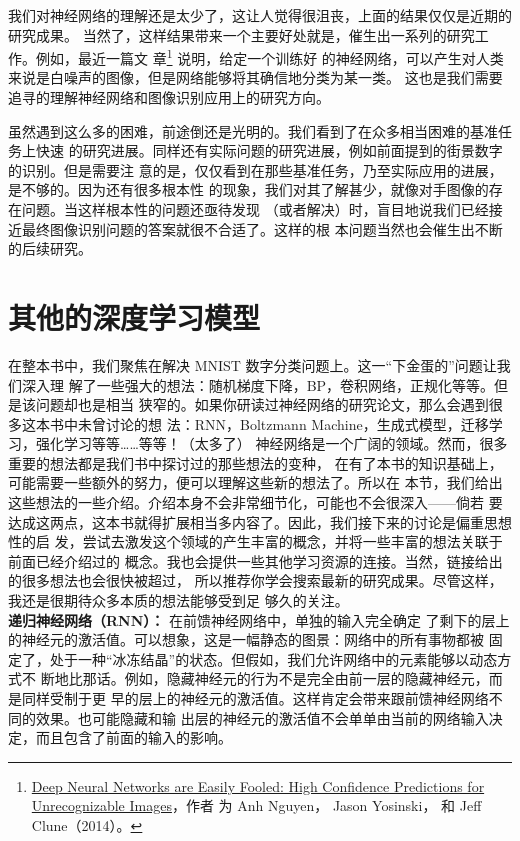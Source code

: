 我们对神经网络的理解还是太少了，这让人觉得很沮丧，上面的结果仅仅是近期的研究成果。
当然了，这样结果带来一个主要好处就是，催生出一系列的研究工作。例如，最近一篇文
章\footnote{\href{http://arxiv.org/abs/1412.1897}{Deep Neural Networks are
    Easily Fooled: High Confidence Predictions for Unrecognizable Images}，作者
  为 Anh Nguyen， Jason Yosinski， 和 Jeff Clune（2014）。} 说明，给定一个训练好
的神经网络，可以产生对人类来说是白噪声的图像，但是网络能够将其确信地分类为某一类。
这也是我们需要追寻的理解神经网络和图像识别应用上的研究方向。

虽然遇到这么多的困难，前途倒还是光明的。我们看到了在众多相当困难的基准任务上快速
的研究进展。同样还有实际问题的研究进展，例如前面提到的街景数字的识别。但是需要注
意的是，仅仅看到在那些基准任务，乃至实际应用的进展，是不够的。因为还有很多根本性
的现象，我们对其了解甚少，就像对手图像的存在问题。当这样根本性的问题还亟待发现
（或者解决）时，盲目地说我们已经接近最终图像识别问题的答案就很不合适了。这样的根
本问题当然也会催生出不断的后续研究。

\section{其他的深度学习模型}
\label{sec:other_approaches_to_deep_neural_nets}

在整本书中，我们聚焦在解决 MNIST 数字分类问题上。这一“下金蛋的”问题让我们深入理
解了一些强大的想法：随机梯度下降，BP，卷积网络，正规化等等。但是该问题却也是相当
狭窄的。如果你研读过神经网络的研究论文，那么会遇到很多这本书中未曾讨论的想
法：RNN，Boltzmann Machine，生成式模型，迁移学习，强化学习等等……等等！（太多了）
神经网络是一个广阔的领域。然而，很多重要的想法都是我们书中探讨过的那些想法的变种，
在有了本书的知识基础上，可能需要一些额外的努力，便可以理解这些新的想法了。所以在
本节，我们给出这些想法的一些介绍。介绍本身不会非常细节化，可能也不会很深入——倘若
要达成这两点，这本书就得扩展相当多内容了。因此，我们接下来的讨论是偏重思想性的启
发，尝试去激发这个领域的产生丰富的概念，并将一些丰富的想法关联于前面已经介绍过的
概念。我也会提供一些其他学习资源的连接。当然，链接给出的很多想法也会很快被超过，
所以推荐你学会搜索最新的研究成果。尽管这样，我还是很期待众多本质的想法能够受到足
够久的关注。\\

\textbf{递归神经网络（RNN）：} 在前馈神经网络中，单独的输入完全确定
了剩下的层上的神经元的激活值。可以想象，这是一幅静态的图景：网络中的所有事物都被
固定了，处于一种“冰冻结晶”的状态。但假如，我们允许网络中的元素能够以动态方式不
断地比那话。例如，隐藏神经元的行为不是完全由前一层的隐藏神经元，而是同样受制于更
早的层上的神经元的激活值。这样肯定会带来跟前馈神经网络不同的效果。也可能隐藏和输
出层的神经元的激活值不会单单由当前的网络输入决定，而且包含了前面的输入的影响。

